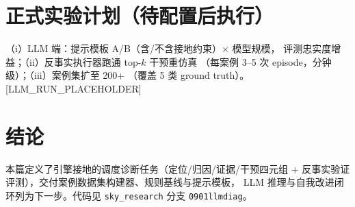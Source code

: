 \documentclass[UTF8,12pt,a4paper]{ctexart}
\begin{document}
\section{正式实验计划（待配置后执行）}

（i）LLM 端：提示模板 A/B（含/不含接地约束）$\times$ 模型规模，
评测忠实度增益；（ii）反事实执行器跑通 top-$k$ 干预重仿真
（每案例 3--5 次 episode，分钟级）；（iii）案例集扩至 200+
（覆盖 5 类 ground truth）。[LLM\_RUN\_PLACEHOLDER]

\section{结论}

本篇定义了引擎接地的调度诊断任务（定位/归因/证据/干预四元组 +
反事实验证评测），交付案例数据集构建器、规则基线与提示模板，
LLM 推理与自我改进闭环列为下一步。代码见 \texttt{sky\_research}
分支 \texttt{0901llmdiag}。



\end{document}
